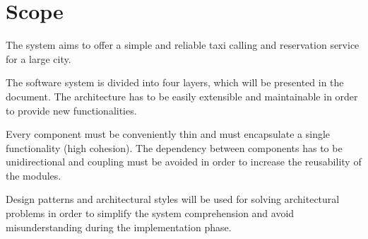 \section{Scope}
\label{sec:scope}

The system aims to offer a simple and reliable taxi calling and reservation service for a large city.

The software system is divided into four layers, which will be presented in the document. The architecture has to be easily extensible and maintainable in order to provide new functionalities.

 Every component must be conveniently thin and must encapsulate a single functionality (high cohesion).
 The dependency between components has to be unidirectional and coupling must be avoided in order to increase the reusability of the modules.

 Design patterns and architectural styles will be used for solving architectural problems in order to simplify the system comprehension and avoid misunderstanding during the implementation phase.
